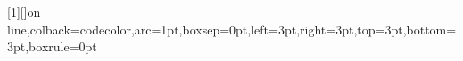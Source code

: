 \pagestyle{simple}



\renewcommand{\cftchapterdotsep}{5}

\renewcommand{\cftchapterfont}{}
\renewcommand{\cftchapterpagefont}{}

\setlength{\FrameSep}{0em}
\setlength{\fboxrule}{2.5pt}

\newenvironment{customleftbar}[1][\parindent]
  {\def\FrameCommand{\hspace{#1}\textcolor[rgb]{0.65, 0.65, 0.65}{\vrule width \fboxrule} \hspace{-1.0em}}%
   \MakeFramed {\advance\hsize-\width \FrameRestore}\vspace{0pt}}%
  {\vspace{0pt}\endMakeFramed}

\let\oldquote\quote
\let\endoldquote\endquote
\renewenvironment{quote}
  {\begin{customleftbar}\oldquote\raggedright}
  {\endoldquote\end{customleftbar}}

\usepackage{framed}
\newenvironment{Shaded}{\begin{shaded}}{\end{shaded}}

\usepackage{tcolorbox}
\newtcbox{\codebox}[1][]{on line,colback=codecolor,arc=1pt,boxsep=0pt,left=3pt,right=3pt,top=3pt,bottom=3pt,boxrule=0pt}


